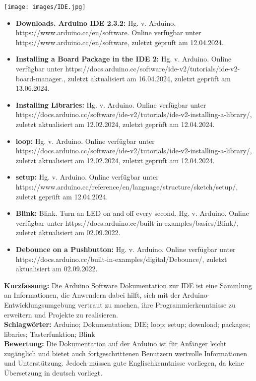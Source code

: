 {
	\texttt{[image: images/IDE.jpg]}
\begin{itemize}
	\item \textbf{Downloads. Arduino IDE 2.3.2:}
	Hg. v. Arduino. https://www.arduino.cc/en/software. Online verfügbar unter https://www.arduino.cc/en/software, zuletzt geprüft am 12.04.2024.
	\item \textbf{Installing a Board Package in the IDE 2:}
	Hg. v. Arduino. Online verfügbar unter https://docs.arduino.cc/software/ide-v2/tutorials/ide-v2-board-manager., zuletzt aktualisiert am 16.04.2024, zuletzt geprüft am 13.06.2024.
	\item \textbf{Installing Libraries:}
	Hg. v. Arduino. Online verfügbar unter https://docs.arduino.cc/software/ide-v2/tutorials/ide-v2-installing-a-library/, zuletzt aktualisiert am 12.02.2024, zuletzt geprüft am 12.04.2024.
	\item \textbf{loop:} Hg. v. Arduino. Online verfügbar unter https://docs.arduino.cc/software/ide-v2/tutorials/ide-v2-installing-a-library/, zuletzt aktualisiert am 12.02.2024, zuletzt geprüft am 12.04.2024.
	\item \textbf{setup:} Hg. v. Arduino. Online verfügbar unter https://www.arduino.cc/reference/en/language/structure/sketch/setup/, zuletzt geprüft am 12.04.2024.
	\item \textbf{Blink:} Blink. Turn an LED on and off every second. Hg. v. Arduino. Online verfügbar unter https://docs.arduino.cc/built-in-examples/basics/Blink/, zuletzt aktualisiert am 02.09.2022.	
	\item \textbf{Debounce on a Pushbutton:} Hg. v. Arduino. Online verfügbar unter https://docs.arduino.cc/built-in-examples/digital/Debounce/, zuletzt aktualisiert am	02.09.2022.
\end{itemize}
\textbf{Kurzfassung:}
Die Arduino Software Dokumentation zur IDE ist eine Sammlung an Informationen, die Anwendern dabei hilft, sich mit der Arduino-Entwicklungsumgebung vertraut zu machen, ihre Programmierkenntnisse zu erweitern und Projekte zu realisieren. 
\\ \textbf{Schlagwörter:}
Arduino; Dokumentation; DIE; loop; setup; download; packages; libaries; Tasterfunktion; Blink
\\ \textbf{Bewertung:}
Die Dokumentation auf der Arduino ist für Anfänger leicht zugänglich und bietet auch fortgeschrittenen Benutzern wertvolle Informationen und Unterstützung. Jedoch müssen gute Englischkenntnisse vorliegen, da keine Übersetzung in deutsch vorliegt.
}


